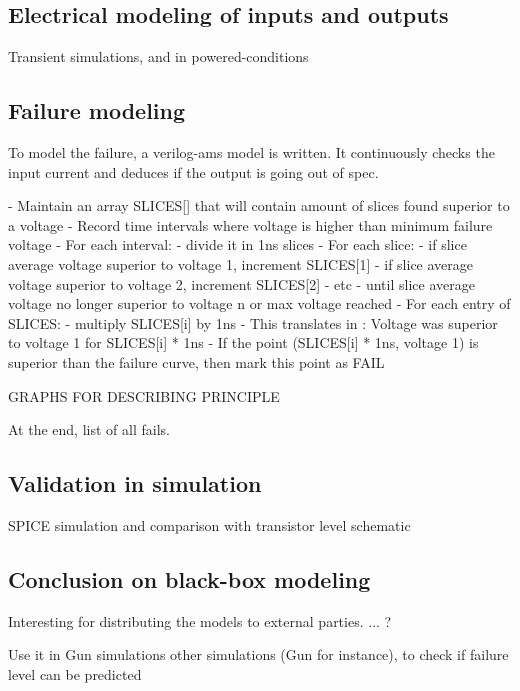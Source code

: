 \subsection{Electrical modeling of inputs and outputs}


Transient simulations, and in powered-conditions

%
\subsection{Failure modeling}


%
To model the failure, a verilog-ams model is written.
It continuously checks the input current and deduces if the output is going out of spec.

\begin{algorithmic}
- Maintain an array SLICES[] that will contain amount of slices found superior to a voltage
- Record time intervals where voltage is higher than minimum failure voltage
- For each interval:
  - divide it in 1ns slices
  - For each slice:
      - if slice average voltage superior to voltage 1, increment SLICES[1]
      - if slice average voltage superior to voltage 2, increment SLICES[2]
      - etc
      - until slice average voltage no longer superior to voltage n or max voltage reached
- For each entry of SLICES:
  - multiply SLICES[i] by 1ns
  - This translates in : Voltage was superior to voltage 1 for SLICES[i] * 1ns
  - If the point (SLICES[i] * 1ns, voltage 1) is superior than the failure curve, then mark this point as FAIL
\end{algorithmic}

GRAPHS FOR DESCRIBING PRINCIPLE

At the end, list of all fails.

\subsection{Validation in simulation}

SPICE simulation and comparison with transistor level schematic

\subsection{Conclusion on black-box modeling}

Interesting for distributing the models to external parties.
... ?

Use it in Gun simulations other simulations (Gun for instance), to check if failure level can be predicted
